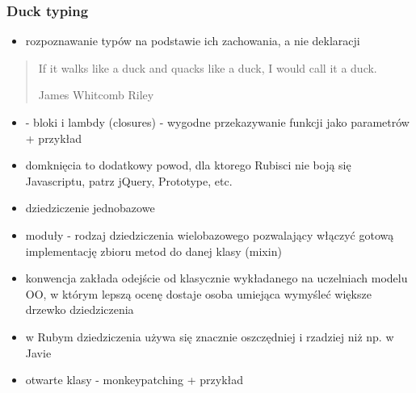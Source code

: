 \documentclass[12t]{beamer}
\begin{document}
\begin{frame}
  \frametitle{Duck typing}
  \begin{itemize}
  \item rozpoznawanie typów na podstawie ich zachowania, a nie deklaracji
  \end{itemize}
  \begin{quote}
    If it walks like a duck and quacks like a duck, I would call it a
    duck.

    \hfill James Whitcomb Riley
  \end{quote}
\end{frame}

\begin{frame}
  \begin{itemize}
  \item - bloki i lambdy (closures) - wygodne przekazywanie funkcji
    jako parametrów + przykład
  \item domknięcia to dodatkowy powod, dla ktorego Rubisci nie boją
    się Javascriptu, patrz jQuery, Prototype, etc.
  \end{itemize}
\end{frame}

\begin{frame}
  \begin{itemize}
  \item dziedziczenie jednobazowe
  \item moduły - rodzaj dziedziczenia wielobazowego pozwalający
    włączyć gotową implementację zbioru metod do danej klasy (mixin)
  \item konwencja zakłada odejście od klasycznie wykładanego na
    uczelniach modelu OO, w którym lepszą ocenę dostaje osoba
    umiejąca wymyśleć większe drzewko dziedziczenia
  \item w Rubym dziedziczenia używa się znacznie oszczędniej i
    rzadziej niż np. w Javie
  \end{itemize}
\end{frame}

\begin{frame}
  \begin{itemize}
  \item otwarte klasy - monkeypatching + przykład
  \end{itemize}
\end{frame}

\begin{frame}[fragile]
  
\end{frame}
\end{document}
